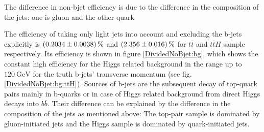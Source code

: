 The difference in non-bjet efficiency is due to the difference in the composition of the jets: one is gluon and the other quark

The efficiency of taking only light jets into account and excluding the b-jets explicitly is $\SI{0.2034\pm 0.0038}{\percent}$ and $\SI{2.356\pm 0.016}{\percent}$ for $t\bar{t}$ and $t\bar{t}H$ sample respectively. Its efficiency is shown in figure \ref{DividedNoBjet:bg}, which shows the constant high efficiency for the Higgs related background in the range up to $\SI{120}{\giga\electronvolt}$ for the truth b-jets' transverse momentum (see fig. \ref{DividedNoBjet:bg:ttH}). Sources of b-jets are the subsequent decay of top-quark pairs mainly in b-quarks or in case of Higgs related background from direct Higgs decays into $b\bar{b}$. Their difference can be explained by the difference in the composition of the jets as mentioned above: The top-pair sample is dominated by gluon-initiated jets and the Higgs sample is dominated by quark-initiated jets.\par
%
